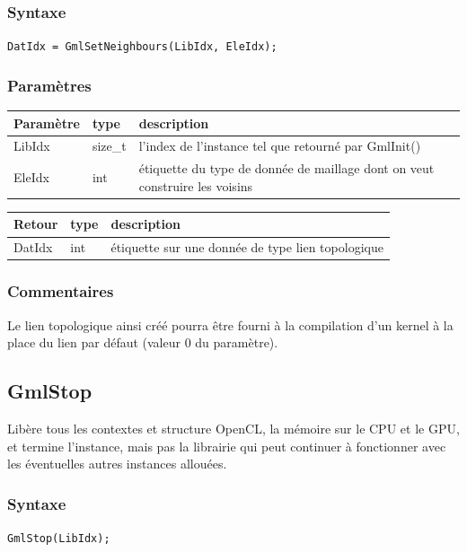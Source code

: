 \documentclass[a4paper,12pt]{article}
\begin{document}
\subsubsection*{Syntaxe}

{\tt DatIdx = GmlSetNeighbours(LibIdx, EleIdx);}

\subsubsection*{Paramètres}

\begin{tabular}{|m{2cm}|m{1.5cm}|m{10.5cm}|}
\hline
Paramètre  & type    & description \\
\hline
LibIdx     & size\_t & l'index de l'instance tel que retourné par GmlInit() \\
\hline
EleIdx     & int     & étiquette du type de donnée de maillage dont on veut construire les voisins \\
\hline
\end{tabular}

\medskip

\begin{tabular}{|m{2cm}|m{1.5cm}|m{10.5cm}|}
\hline
Retour     & type   & description \\
\hline
DatIdx     & int    & étiquette sur une donnée de type lien topologique \\
\hline
\end{tabular}

\subsubsection*{Commentaires}
Le lien topologique ainsi créé pourra être fourni à la compilation d'un kernel à la place du lien par défaut (valeur 0 du paramètre).


\subsection{GmlStop}

Libère tous les contextes et structure OpenCL, la mémoire sur le CPU et le GPU, et termine l'instance, mais pas la librairie qui peut continuer à fonctionner avec les éventuelles autres instances allouées.

\subsubsection*{Syntaxe}

{\tt GmlStop(LibIdx);}
\end{document}
